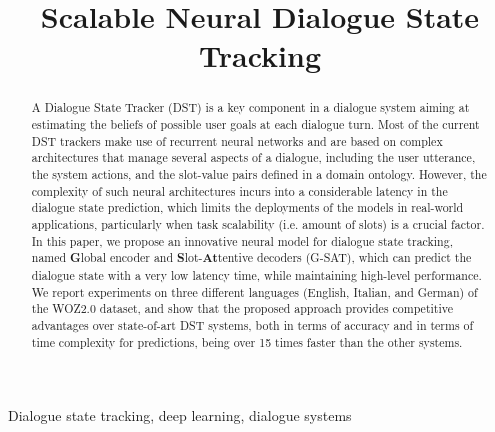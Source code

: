 \documentclass{article}
\title{Scalable Neural Dialogue State Tracking}
\begin{document}
\maketitle

\begin{abstract}

A Dialogue State Tracker (DST) is a key component in a dialogue system aiming at estimating the beliefs of possible user goals at each dialogue turn.
Most of the current DST trackers make use of recurrent neural networks and are based on complex architectures that manage several aspects of a dialogue, including the user utterance, the system actions, and the slot-value pairs defined in a domain ontology. However, the complexity of such neural architectures incurs into a considerable latency in the dialogue state prediction, which limits the deployments of the models in real-world applications, particularly when task scalability (i.e. amount of slots) is a crucial factor.
In this paper, we propose an innovative neural model for dialogue state tracking, named \textbf{G}lobal encoder and \textbf{S}lot-\textbf{At}tentive decoders (G-SAT), which can predict the dialogue state with a very low latency time, while maintaining high-level performance. 
We report experiments on three different languages (English, Italian, and German) of the WOZ2.0 dataset, and show that the proposed approach provides competitive advantages over state-of-art DST systems, both in terms of accuracy and in terms of time complexity for predictions, being over 15 times faster than the other systems.

\end{abstract}
\begin{keywords}
Dialogue state tracking, deep learning, dialogue systems
\end{keywords}
\end{document}
